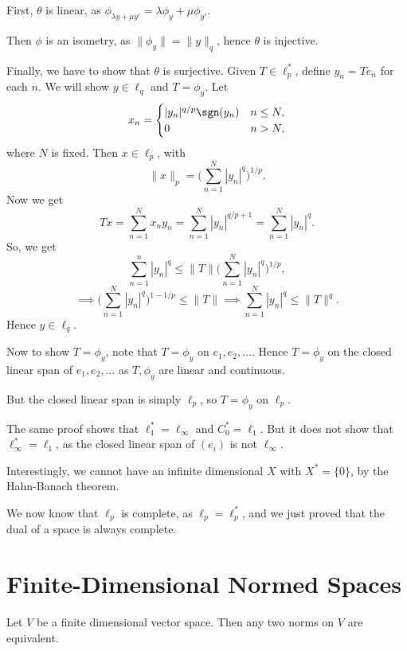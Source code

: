 \documentclass[12pt]{article}
\begin{document}
\begin{proofbox}
	First, $\theta$ is linear, as $\phi_{\lambda y + \mu y'} = \lambda \phi_y + \mu \phi_{y'}$.

	Then $\phi$ is an isometry, as $\|\phi_y\| = \|y\|_q$, hence $\theta$ is injective.

	Finally, we have to show that $\theta$ is surjective. Given $T \in \ell_p^{\ast}$, define $y_n = T e_n$ for each $n$. We will show $y \in \ell_q$ and $T = \phi_y$. Let
	\[
	x_n=
	\begin{cases}
		|y_n|^{q/p}\sgn(y_n) & n \leq N,\\
		0 & n > N,
	\end{cases}
	\]
	where $N$ is fixed. Then $x \in \ell_p$, with
	\[
	\|x\|_p = \Biggl( \sum_{n = 1}^{N} |y_n|^{q} \Biggr)^{1/p}.
	\]
	Now we get
	\[
	Tx = \sum_{n = 1}^{N} x_n y_n = \sum_{n = 1}^{N} |y_n|^{q/p + 1} = \sum_{n = 1}^{N} |y_n|^{q}.
	\]
	So, we get
	\[
	\sum_{n = 1}^{n} |y_n|^{q} \leq \|T\| \Biggl( \sum_{n = 1}^{N} |y_n|^{q} \Biggr)^{1/p},
	\]
	\[
	\implies \Biggl( \sum_{n = 1}^{N} |y_n|^{q} \Biggr)^{1 - 1/p} \leq \|T\| \implies \sum_{n = 1}^{N} |y_n|^{q} \leq \|T\|^{q}.
	\]
	Hence $y \in \ell_q$.

	Now to show $T = \phi_y$, note that $T = \phi_y$ on $e_1, e_2, \ldots$. Hence $T = \phi_y$ on the closed linear span of $e_1, e_2, \ldots$ as $T, \phi_y$ are linear and continuous.

	But the closed linear span is simply $\ell_p$, so $T = \phi_y$ on $\ell_p$.

	The same proof shows that $\ell_1^{\ast} = \ell_\infty$ and $C_0^{\ast} = \ell_1$. But it does not show that $\ell_\infty^{\ast} = \ell_1$, as the closed linear span of $(e_i)$ is not $\ell_\infty$.
\end{proofbox}

Interestingly, we cannot have an infinite dimensional $X$ with $X^{\ast} = \{0\}$, by the Hahn-Banach theorem.

We now know that $\ell_p$ is complete, as $\ell_p = \ell_p^{\ast}$, and we just proved that the dual of a space is always complete.


\newpage

\section{Finite-Dimensional Normed Spaces}
\label{sec:finite}

\begin{theorem}
	Let $V$ be a finite dimensional vector space. Then any two norms on $V$ are equivalent.
\end{theorem}
\end{document}
